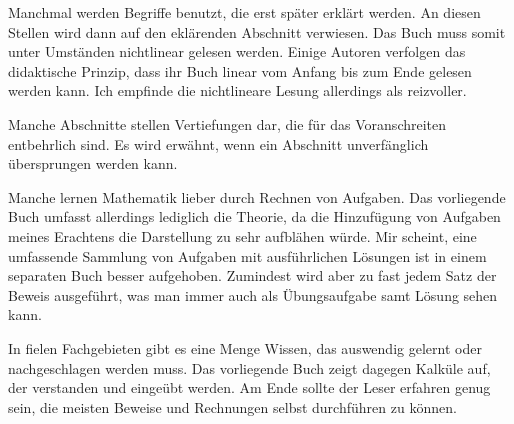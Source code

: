 
Manchmal werden Begriffe benutzt, die erst später erklärt werden.
An diesen Stellen wird dann auf den eklärenden Abschnitt verwiesen.
Das Buch muss somit unter Umständen nichtlinear gelesen werden. Einige
Autoren verfolgen das didaktische Prinzip, dass ihr Buch linear vom Anfang
bis zum Ende gelesen werden kann. Ich empfinde die nichtlineare Lesung
allerdings als reizvoller.

Manche Abschnitte stellen Vertiefungen dar, die für das Voranschreiten
entbehrlich sind. Es wird erwähnt, wenn ein Abschnitt unverfänglich
übersprungen werden kann.

Manche lernen Mathematik lieber durch Rechnen von Aufgaben. Das
vorliegende Buch umfasst allerdings lediglich die Theorie, da
die Hinzufügung von Aufgaben meines Erachtens die Darstellung zu sehr
aufblähen würde. Mir scheint, eine umfassende Sammlung von Aufgaben
mit ausführlichen Lösungen ist in einem separaten Buch besser
aufgehoben. Zumindest wird aber zu fast jedem Satz der Beweis
ausgeführt, was man immer auch als Übungsaufgabe samt Lösung sehen kann.

In fielen Fachgebieten gibt es eine Menge Wissen, das auswendig
gelernt oder nachgeschlagen werden muss. Das vorliegende Buch zeigt
dagegen Kalküle auf, der verstanden und eingeübt werden. Am Ende sollte
der Leser erfahren genug sein, die meisten Beweise und Rechnungen
selbst durchführen zu können.

